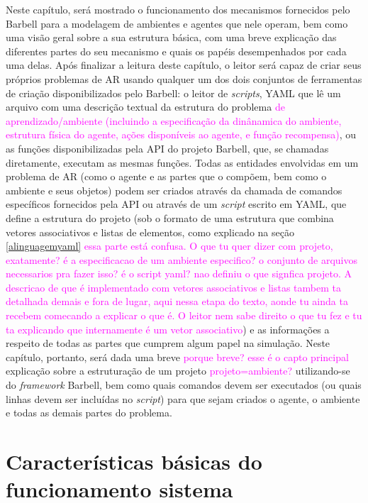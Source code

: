 \documentclass[cic,tc]{iiufrgs}
\newcommand\bruno[1]{\textcolor{magenta}{#1}}
\begin{document}
    
    Neste capítulo, será mostrado o funcionamento dos mecanismos fornecidos pelo Barbell para a modelagem de ambientes e agentes que nele operam, bem como uma
    visão geral sobre a sua estrutura básica, com uma breve explicação das diferentes partes do seu mecanismo e quais os papéis desempenhados por cada uma delas. Após
    finalizar a leitura deste capítulo, o leitor será capaz de criar seus próprios problemas de AR usando qualquer um dos dois conjuntos de ferramentas de criação
    disponibilizados pelo Barbell: o leitor de \textit{scripts}, YAML que lê um arquivo com uma descrição textual da estrutura do problema \bruno{de aprendizado/ambiente (incluindo a especificação da dinânamica do ambiente, estrutura física do agente, ações disponíveis ao agente, e função recompensa)}, ou as funções
    disponibilizadas pela API do projeto Barbell, que, se chamadas diretamente, executam as mesmas funções.
    Todas as entidades envolvidas em um problema de AR (como o agente e as partes que o compõem, bem como o ambiente e seus objetos) podem ser criados através
    da chamada de comandos específicos fornecidos pela API ou através de um \textit{script} escrito em YAML, que define a estrutura do projeto (sob o formato
    de uma estrutura que combina vetores associativos e listas de elementos, como explicado na seção \ref{alinguagemyaml} \bruno{essa parte está confusa. O que tu quer dizer com projeto, exatamente? é a especificacao de um ambiente especifico? o conjunto de arquivos necessarios pra fazer isso? é o script yaml? nao definiu o que signfica projeto. A descricao de que é implementado com vetores associativos e listas tambem ta detalhada demais e fora de lugar, aqui nessa etapa do texto, aonde tu ainda ta recebem comecando a explicar o que é. O leitor nem sabe direito o que tu fez e tu ta explicando que internamente é um vetor associativo}) e as informações
    a respeito de todas as partes que cumprem algum papel na simulação. Neste capítulo, portanto, será dada uma breve \bruno{porque breve? esse é o capto principal} explicação sobre a estruturação de um projeto \bruno{projeto=ambiente?}
    utilizando-se do \textit{framework} Barbell, bem como quais comandos devem ser executados (ou quais linhas devem ser incluídas no \textit{script}) para que sejam criados
    o agente, o ambiente e todas as demais partes do problema.
    \section{Características básicas do funcionamento sistema}
    
\end{document}
